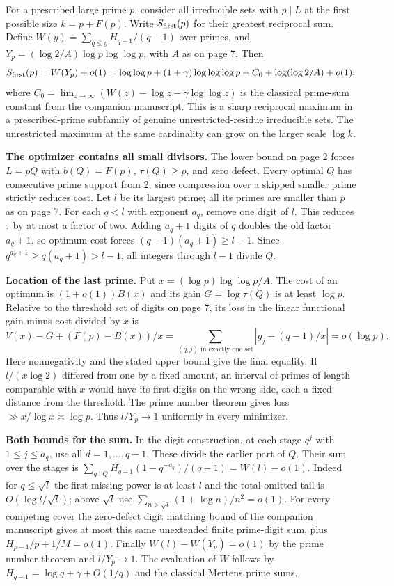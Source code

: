 \newpage
{}
For a prescribed large prime $p$, consider all irreducible sets with $p\mid L$ at the first possible size $k=p+F(p)$. Write $S_{\rm first}(p)$ for their greatest reciprocal sum. Define $W(y)=\sum_{q\le y} H_{q-1}/(q-1)$ over primes, and $Y_p=(\log 2/A)\log p\log\log p$, with $A$ as on page 7. Then
\[
 S_{\rm first}(p)=W(Y_p)+o(1)
 =\log\log p+(1+\gamma)\log\log\log p+C_0+\log(\log 2/A)+o(1),
\]
where $C_0=\lim_{z\to\infty}(W(z)-\log z-\gamma\log\log z)$ is the classical prime-sum constant from the companion manuscript. This is a sharp reciprocal maximum in a prescribed-prime subfamily of genuine unrestricted-residue irreducible sets. The unrestricted maximum at the same cardinality can grow on the larger scale $\log k$.

\textbf{The optimizer contains all small divisors.} The lower bound on page 2 forces $L=pQ$ with $b(Q)=F(p)$, $\tau(Q)\ge p$, and zero defect. Every optimal $Q$ has consecutive prime support from 2, since compression over a skipped smaller prime strictly reduces cost. Let $l$ be its largest prime; all its primes are smaller than $p$ as on page 7. For each $q<l$ with exponent $a_q$, remove one digit of $l$. This reduces $\tau$ by at most a factor of two. Adding $a_q+1$ digits of $q$ doubles the old factor $a_q+1$, so optimum cost forces $(q-1)(a_q+1)\ge l-1$. Since $q^{a_q+1}\ge q(a_q+1)>l-1$, all integers through $l-1$ divide $Q$.

\textbf{Location of the last prime.} Put $x=(\log p)\log\log p/A$. The cost of an optimum is $(1+o(1))B(x)$ and its gain $G=\log\tau(Q)$ is at least $\log p$. Relative to the threshold set of digits on page 7, its loss in the linear functional gain minus cost divided by $x$ is
\[
 V(x)-G+(F(p)-B(x))/x
 =\sum_{(q,j)\text{ in exactly one set}} |g_j-(q-1)/x|
 =o(\log p).
\]
Here nonnegativity and the stated upper bound give the final equality. If $l/(x\log2)$ differed from one by a fixed amount, an interval of primes of length comparable with $x$ would have its first digits on the wrong side, each a fixed distance from the threshold. The prime number theorem gives loss $\gg x/\log x\asymp\log p$. Thus $l/Y_p\to1$ uniformly in every minimizer.

\textbf{Both bounds for the sum.} In the digit construction, at each stage $q^j$ with $1\le j\le a_q$, use all $d=1,\ldots,q-1$. These divide the earlier part of $Q$. Their sum over the stages is $\sum_{q\mid Q}H_{q-1}(1-q^{-a_q})/(q-1)=W(l)-o(1)$. Indeed for $q\le\sqrt l$ the first missing power is at least $l$ and the total omitted tail is $O(\log l/\sqrt l)$; above $\sqrt l$ use $\sum_{n>\sqrt l}(1+\log n)/n^2=o(1)$. For every competing cover the zero-defect digit matching bound of the companion manuscript gives at most this same unextended finite prime-digit sum, plus $H_{p-1}/p+1/M=o(1)$. Finally $W(l)-W(Y_p)=o(1)$ by the prime number theorem and $l/Y_p\to1$. The evaluation of $W$ follows by $H_{q-1}=\log q+\gamma+O(1/q)$ and the classical Mertens prime sums.
